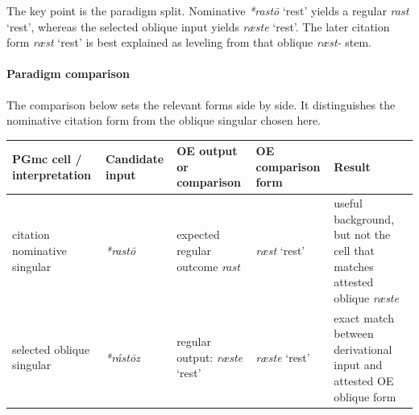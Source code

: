 \documentclass[
  british,
  a4paper,
]{article}
\newcounter{none} %
\providecommand{\Recon}[1]{\emph{*#1}}
\begin{document}
The key point is the paradigm split. Nominative \Recon{rastō} `rest'
yields a regular \emph{rast} `rest', whereas the selected oblique input
yields \emph{ræste} `rest'. The later citation form \emph{ræst} `rest'
is best explained as leveling from that oblique \emph{ræst-} stem.

\paragraph{Paradigm comparison}\label{paradigm-comparison-12}

The comparison below sets the relevant forms side by side. It
distinguishes the nominative citation form from the oblique singular
chosen here.

{\def\LTcaptype{none} %
\begin{longtable}[]{@{}
  >{\raggedright\arraybackslash}p{}
  >{\raggedright\arraybackslash}p{}
  >{\raggedright\arraybackslash}p{}
  >{\raggedright\arraybackslash}p{}
  >{\raggedright\arraybackslash}p{}@{}}
\toprule\noalign{}
\begin{minipage}[b]{\linewidth}\raggedright
PGmc cell / interpretation
\end{minipage} & \begin{minipage}[b]{\linewidth}\raggedright
Candidate input
\end{minipage} & \begin{minipage}[b]{\linewidth}\raggedright
OE output or comparison
\end{minipage} & \begin{minipage}[b]{\linewidth}\raggedright
OE comparison form
\end{minipage} & \begin{minipage}[b]{\linewidth}\raggedright
Result
\end{minipage} \\
\midrule\noalign{}
\endhead
\bottomrule\noalign{}
\endlastfoot
citation nominative singular & {\emph{*rastō}} & expected regular
outcome \emph{rast} & {\emph{ræst}} `rest' & useful background, but not
the cell that matches attested oblique \emph{ræste} \\
selected oblique singular & {\emph{*rástōz}} & regular output:
{\emph{ræste}} `rest' & {\emph{ræste}} `rest' & exact match between
derivational input and attested OE oblique form \\
\end{longtable}
}
\end{document}
